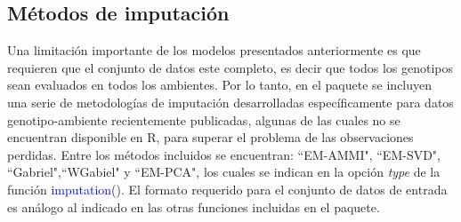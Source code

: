 

\subsection{Métodos de imputación}
\label{subsec:metimp}

Una limitación importante de los modelos presentados anteriormente es que requieren que el conjunto de datos este completo, es decir que todos los genotipos sean evaluados en todos los ambientes. Por lo tanto, en el paquete se incluyen una serie de metodologías de imputación desarrolladas específicamente para datos genotipo-ambiente recientemente publicadas, algunas de las cuales no se encuentran disponible en R, para superar el problema de las observaciones perdidas. Entre los métodos incluidos se encuentran: ``EM-AMMI", ``EM-SVD", ``Gabriel",``WGabiel"  y ``EM-PCA", los cuales se indican en la opción \emph{type} de la función \textcolor{blue}{imputation}(). El formato requerido para el conjunto de datos de entrada es análogo al indicado en las otras funciones incluidas en el paquete. 

